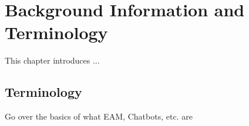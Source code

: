 \chapter{Background Information and Terminology}
\label{ch:background}
This chapter introduces ...

\section{Terminology}
\label{sec:background:terminology}
Go over the basics of what EAM, Chatbots, etc. are